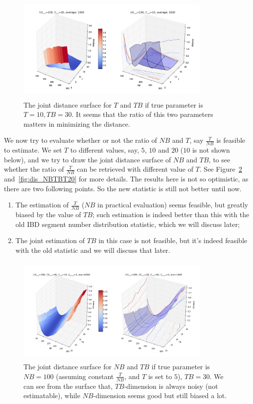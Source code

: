 \documentclass{bioinfo}
\begin{document}
\begin{figure}[h]
\centerline{\includegraphics[width=270pt, height=150pt]{like_NBT.jpg}}
\caption{The joint distance surface for $T$ and $TB$ if true parameter is $T=10,TB=30$. It seems that the ratio of this two parameters matters in minimizing the distance.}\label{fig:dis_NBT}
\end{figure}

We now try to evaluate whether or not the ratio of $NB$ and $T$, say $\frac{T}{NB}$ is feasible to estimate. We set $T$ to different values, say, $5$, $10$ and $20$ ($10$ is not shown below), and we try to draw the joint distance surface of $NB$ and $TB$, to see whether the ratio of $\frac{T}{NB}$ can be retrieved with different value of $T$. See Figure~\ref{fig:dis_NBTBT5} and~\ref{fig:dis_NBTBT20} for more details. The results here is not so optimistic, as there are two following points. So the new statistic is still not better until now.

\begin{enumerate}
\item The estimation of $\frac{T}{NB}$ ($NB$ in practical evaluation) seems feasible, but greatly biased by the value of $TB$; such estimation is indeed better than this with the old IBD segment number distribution statistic, which we will discuss later;
\item The joint estimation of $TB$ in this case is not feasible, but it's indeed feasible with the old statistic and we will discuss that later.
\end{enumerate}

\begin{figure}[h]
\centerline{\includegraphics[width=270pt, height=150pt]{like_NBTBT5_2.png}}
\caption{The joint distance surface for $NB$ and $TB$ if true parameter is $NB=100$ (assuming constant $\frac{T}{NB}$, and $T$ is set to $5$), $TB=30$. We can see from the surface that, $TB$-dimension is always noisy (not estimatable), while $NB$-dimension seems good but still biased a lot.}\label{fig:dis_NBTBT5}
\end{figure}
\end{document}
